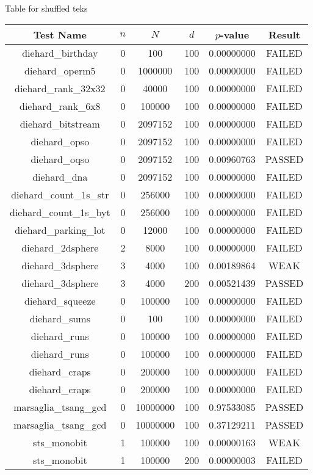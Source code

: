 Table for shuffled teks

\begin{longtable}{cccccc}
\toprule
Test Name & $n$ & $N$ & $d$ & $p$-value & Result \\
\midrule
\endhead
diehard\_birthday & 0 & 100 & 100 & 0.00000000 & FAILED \\
diehard\_operm5 & 0 & 1000000 & 100 & 0.00000000 & FAILED \\
diehard\_rank\_32x32 & 0 & 40000 & 100 & 0.00000000 & FAILED \\
diehard\_rank\_6x8 & 0 & 100000 & 100 & 0.00000000 & FAILED \\
diehard\_bitstream & 0 & 2097152 & 100 & 0.00000000 & FAILED \\
diehard\_opso & 0 & 2097152 & 100 & 0.00000000 & FAILED \\
diehard\_oqso & 0 & 2097152 & 100 & 0.00960763 & PASSED \\
diehard\_dna & 0 & 2097152 & 100 & 0.00000000 & FAILED \\
diehard\_count\_1s\_str & 0 & 256000 & 100 & 0.00000000 & FAILED \\
diehard\_count\_1s\_byt & 0 & 256000 & 100 & 0.00000000 & FAILED \\
diehard\_parking\_lot & 0 & 12000 & 100 & 0.00000000 & FAILED \\
diehard\_2dsphere & 2 & 8000 & 100 & 0.00000000 & FAILED \\
diehard\_3dsphere & 3 & 4000 & 100 & 0.00189864 & WEAK \\
diehard\_3dsphere & 3 & 4000 & 200 & 0.00521439 & PASSED \\
diehard\_squeeze & 0 & 100000 & 100 & 0.00000000 & FAILED \\
diehard\_sums & 0 & 100 & 100 & 0.00000000 & FAILED \\
diehard\_runs & 0 & 100000 & 100 & 0.00000000 & FAILED \\
diehard\_runs & 0 & 100000 & 100 & 0.00000000 & FAILED \\
diehard\_craps & 0 & 200000 & 100 & 0.00000000 & FAILED \\
diehard\_craps & 0 & 200000 & 100 & 0.00000000 & FAILED \\
marsaglia\_tsang\_gcd & 0 & 10000000 & 100 & 0.97533085 & PASSED \\
marsaglia\_tsang\_gcd & 0 & 10000000 & 100 & 0.37129211 & PASSED \\
sts\_monobit & 1 & 100000 & 100 & 0.00000163 & WEAK \\
sts\_monobit & 1 & 100000 & 200 & 0.00000003 & FAILED \\

\end{longtable}
